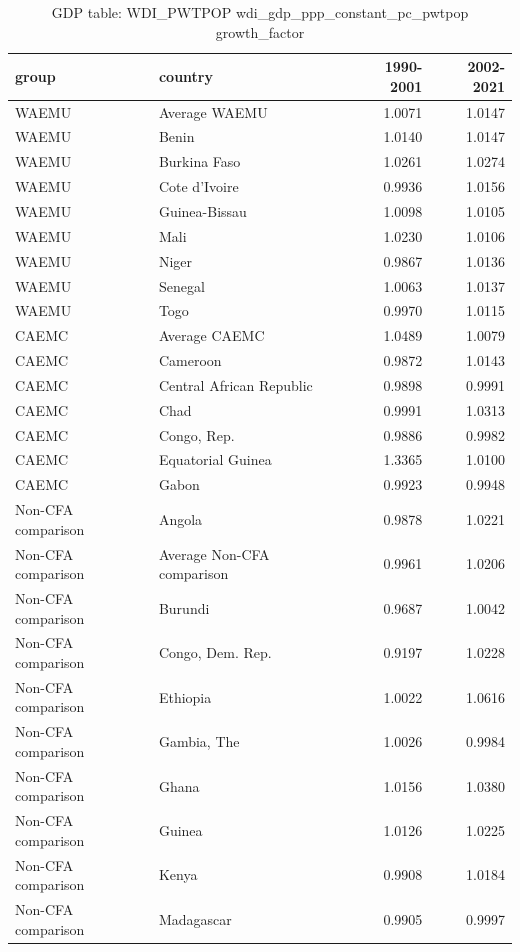 \begin{table}

\caption{GDP table: WDI_PWTPOP wdi_gdp_ppp_constant_pc_pwtpop growth_factor}
\centering
\begin{tabular}[t]{llrr}
\toprule
group & country & 1990-2001 & 2002-2021\\
\midrule
WAEMU & Average WAEMU & 1.0071 & 1.0147\\
WAEMU & Benin & 1.0140 & 1.0147\\
WAEMU & Burkina Faso & 1.0261 & 1.0274\\
WAEMU & Cote d'Ivoire & 0.9936 & 1.0156\\
WAEMU & Guinea-Bissau & 1.0098 & 1.0105\\
\addlinespace
WAEMU & Mali & 1.0230 & 1.0106\\
WAEMU & Niger & 0.9867 & 1.0136\\
WAEMU & Senegal & 1.0063 & 1.0137\\
WAEMU & Togo & 0.9970 & 1.0115\\
CAEMC & Average CAEMC & 1.0489 & 1.0079\\
\addlinespace
CAEMC & Cameroon & 0.9872 & 1.0143\\
CAEMC & Central African Republic & 0.9898 & 0.9991\\
CAEMC & Chad & 0.9991 & 1.0313\\
CAEMC & Congo, Rep. & 0.9886 & 0.9982\\
CAEMC & Equatorial Guinea & 1.3365 & 1.0100\\
\addlinespace
CAEMC & Gabon & 0.9923 & 0.9948\\
Non-CFA comparison & Angola & 0.9878 & 1.0221\\
Non-CFA comparison & Average Non-CFA comparison & 0.9961 & 1.0206\\
Non-CFA comparison & Burundi & 0.9687 & 1.0042\\
Non-CFA comparison & Congo, Dem. Rep. & 0.9197 & 1.0228\\
\addlinespace
Non-CFA comparison & Ethiopia & 1.0022 & 1.0616\\
Non-CFA comparison & Gambia, The & 1.0026 & 0.9984\\
Non-CFA comparison & Ghana & 1.0156 & 1.0380\\
Non-CFA comparison & Guinea & 1.0126 & 1.0225\\
Non-CFA comparison & Kenya & 0.9908 & 1.0184\\
\addlinespace
Non-CFA comparison & Madagascar & 0.9905 & 0.9997\\

\end{tabular}
\end{table}
